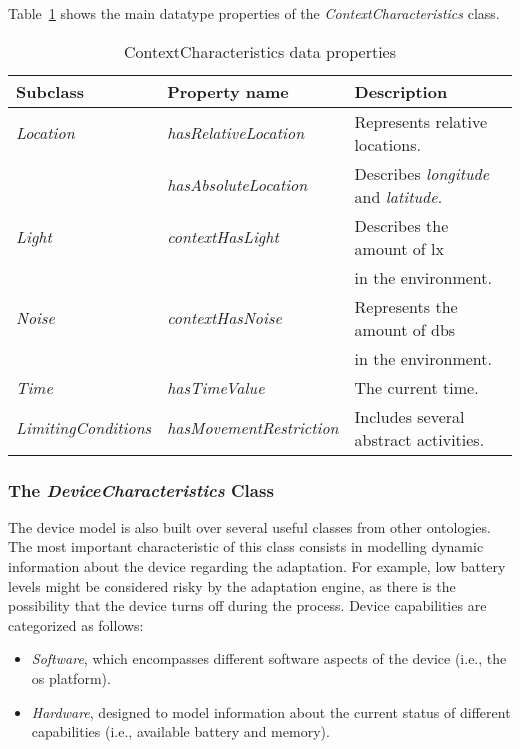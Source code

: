 Table~\ref{tbl:context_characteristics_ontology} shows the main datatype properties
of the \textit{ContextCharacteristics} class.

\begin{table}
  \caption{ContextCharacteristics data properties}
 \label{tbl:context_characteristics_ontology}
\footnotesize
\centering
 \begin{tabular}{l l l}
  \hline 
  \textbf{Subclass} 	& \textbf{Property name} 	& \textbf{Description}		\\
  \hline
  \textit{Location}	& \textit{hasRelativeLocation}	& Represents relative locations.\\
			& \textit{hasAbsoluteLocation}	& Describes \textit{longitude} and \textit{latitude}.\\
  \textit{Light}	& \textit{contextHasLight}	& Describes the amount of \ac{lx}\\
			& 				& in the environment.		\\
  \textit{Noise}	& \textit{contextHasNoise}	& Represents the amount of \acp{db}\\
			& 				& in the environment.		\\
  \textit{Time}		& \textit{hasTimeValue}		& The current time.		\\
  \textit{LimitingConditions}& \textit{hasMovementRestriction}&	Includes several abstract activities.\\
  \hline
  
\end{tabular}
\end{table}


\subsubsection{The \textit{DeviceCharacteristics} Class}
\label{sec:device_characteristics_class}

The device model is also built over several useful classes from other ontologies.
The most important characteristic of this class consists in modelling dynamic
information about the device regarding the adaptation. For example, low battery
levels might be considered risky by the adaptation engine, as there is the possibility
that the device turns off during the process. Device capabilities are categorized
as follows:

\begin{itemize}
 \item \textit{Software}, which encompasses different software aspects of the
 device (i.e., the \ac{os} platform). 
 
 \item \textit{Hardware}, designed to model information about the current status
 of different capabilities (i.e., available battery and memory).
\end{itemize}


